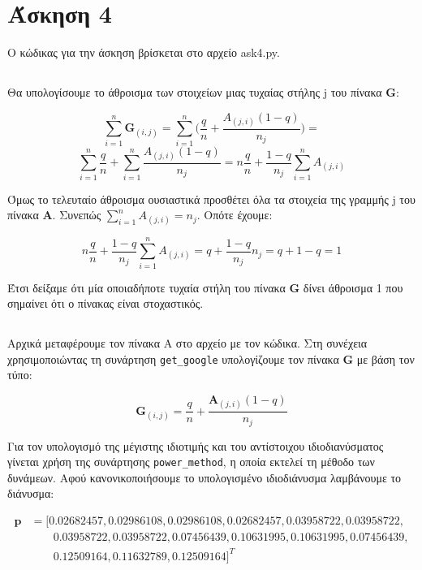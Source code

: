 \documentclass[a4paper,11pt]{article}
\newcommand{\lt}{\latintext}
\newcommand{\gt}{\greektext}
\begin{document}
\section{Άσκηση 4}

Ο κώδικας για την άσκηση βρίσκεται στο αρχείο \lt ask4.py. \gt

\subsection{} %

Θα υπολογίσουμε το άθροισμα των στοιχείων μιας τυχαίας στήλης \lt j \gt του πίνακα \lt \textbf{G}:

\[\sum_{i=1}^{n}\boldsymbol{G}_{(i,j)} = \sum_{i=1}^{n}\bigg(\frac{q}{n}+\frac{A_{(j,i)}(1-q)}{n_j}\bigg) =\] \[\sum_{i=1}^{n}\frac{q}{n} + \sum_{i=1}^{n}\frac{A_{(j,i)}(1-q)}{n_j} = n\frac{q}{n} + \frac{1-q}{n_j}\sum_{i=1}^{n}A_{(j,i)}\]

\gt Όμως το τελευταίο άθροισμα ουσιαστικά προσθέτει όλα τα στοιχεία της γραμμής \lt j \gt του πίνακα \lt \textbf{A}. \gt Συνεπώς \(\sum_{i=1}^{n}A_{(j,i)} = n_j\). Οπότε έχουμε:

\[n\frac{q}{n} + \frac{1-q}{n_j}\sum_{i=1}^{n}A_{(j,i)} = q + \frac{1-q}{n_j}n_j = q+1-q = 1\]

Έτσι δείξαμε ότι μία οποιαδήποτε τυχαία στήλη του πίνακα \lt \textbf{G} \gt δίνει άθροισμα 1 που σημαίνει ότι ο πίνακας είναι στοχαστικός.

\subsection{} %

\gt Αρχικά μεταφέρουμε τον πίνακα Α στο αρχείο με τον κώδικα. Στη συνέχεια χρησιμοποιώντας τη συνάρτηση \lt \verb|get_google| \gt υπολογίζουμε τον πίνακα $\boldsymbol{G}$ με βάση τον τύπο:

\[\boldsymbol{G}_{(i,j)} = \frac{q}{n} + \frac{\boldsymbol{A}_{(j,i)}(1-q)}{n_j}\]

Για τον υπολογισμό της μέγιστης ιδιοτιμής και του αντίστοιχου ιδιοδιανύσματος γίνεται χρήση της συνάρτησης \lt \verb|power_method|, \gt η οποία εκτελεί τη μέθοδο των δυνάμεων. Αφού κανονικοποιήσουμε το υπολογισμένο ιδιοδιάνυσμα λαμβάνουμε το διάνυσμα:

    \begin{align*}
        \boldsymbol{p} &= [0.02682457, 0.02986108, 0.02986108, 0.02682457, 0.03958722, 0.03958722, \\ &\qquad0.03958722, 0.03958722, 0.07456439, 0.10631995, 0.10631995, 0.07456439, \\ &\qquad0.12509164, 0.11632789, 0.12509164]^T
    \end{align*}
\end{document}
